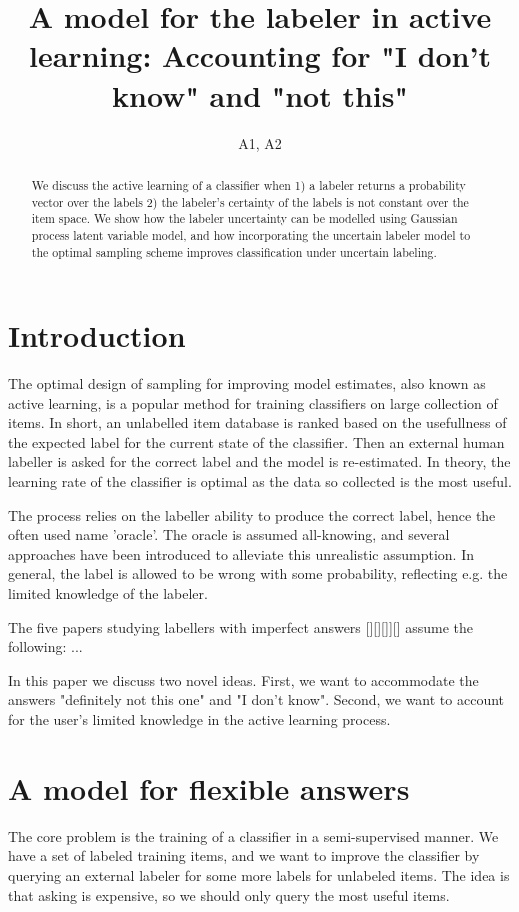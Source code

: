 \documentclass[10pt, onecolumn]{article}
\begin{document}
\title{A model for the labeler in active learning: Accounting for "I don't know" and "not this" }
\author{A1, A2}
\maketitle


\begin{abstract}
We discuss the active learning of a classifier when 1) a labeler returns a probability vector over the labels 2) the labeler's certainty of the labels is not constant over the item space. We show how the labeler uncertainty can be modelled using Gaussian process latent variable model, and how incorporating the uncertain labeler model to the optimal sampling scheme improves classification under uncertain labeling.
\end{abstract}


\section{Introduction}

The optimal design of sampling for improving model estimates, also known as active learning, is a popular method for training classifiers on large collection of items. In short, an unlabelled item database is ranked based on the usefullness of the expected label for the current state of the classifier. Then an external human labeller is asked for the correct label and the model is re-estimated. In theory, the learning rate of the classifier is optimal as the data so collected is the most useful.

The process relies on the labeller ability to produce the correct label, hence the often used name 'oracle'. The oracle is assumed all-knowing, and several approaches have been introduced to alleviate this unrealistic assumption. In general, the label is allowed to be wrong with some probability, reflecting e.g. the limited knowledge of the labeler. 

The five papers studying labellers with imperfect answers [][][]][] assume the following: ...


In this paper we discuss two novel ideas. First, we want to accommodate the answers "definitely not this one" and "I don't know". Second, we want to account for the user's limited knowledge in the active learning process.

\section{A model for flexible answers}
The core problem is the training of a classifier in a semi-supervised manner. We have a set of labeled training items, and we want to improve the classifier by querying an external labeler for some more labels for unlabeled items. The idea is that asking is expensive, so we should only query the most useful items.
\end{document}
